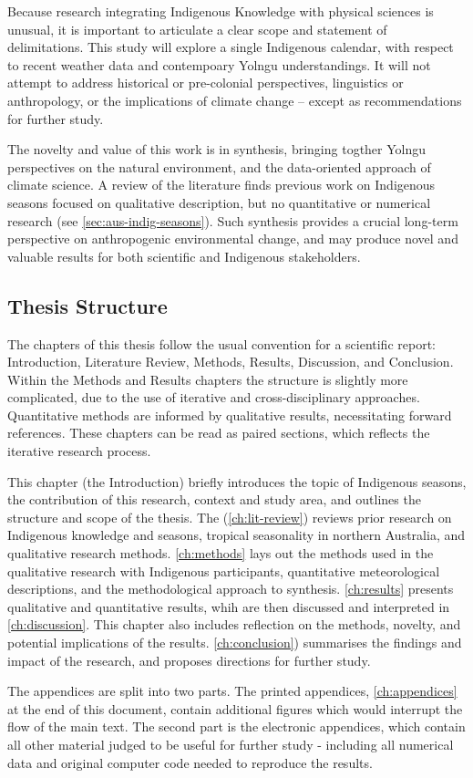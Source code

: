 Because research integrating Indigenous Knowledge with physical sciences is
unusual, it is important to articulate a clear scope and statement of delimitations.
This study will explore a single Indigenous calendar, with respect to recent weather data
and contempoary Yolngu understandings.  It will not attempt to address historical
or pre-colonial perspectives, linguistics or anthropology, or the implications
of climate change -- except as recommendations for further study.

The novelty and value of this work is in synthesis, bringing
togther Yolngu perspectives on the natural environment, and the
data-oriented approach of climate science.  A review of the literature
finds previous work on Indigenous seasons focused on qualitative description, but
no quantitative or numerical research (see \cref{sec:aus-indig-seasons}).
Such synthesis provides a crucial long-term perspective on
anthropogenic environmental change, and may produce novel and valuable
results for both scientific and Indigenous stakeholders.



\subsection*{Thesis Structure}

The chapters of this thesis follow the usual convention for a scientific
report: Introduction, Literature Review, Methods, Results, Discussion,
and Conclusion.  Within the Methods and Results chapters
the structure is slightly more complicated, due to the use of iterative and
cross-disciplinary approaches.  Quantitative methods are informed by
qualitative results, necessitating forward references.  These chapters
can be read as paired sections, which reflects the iterative research process.

This chapter (the Introduction) briefly introduces the topic of
Indigenous seasons, the contribution of this research, context and
study area, and outlines the structure and scope of the thesis.
The  (\cref{ch:lit-review}) reviews prior research
on Indigenous knowledge and seasons, tropical seasonality in northern
Australia, and qualitative research methods.
%
\cref{ch:methods} lays out the methods used in the qualitative research
with Indigenous participants, quantitative meteorological descriptions,
and the methodological approach to synthesis.  \cref{ch:results} presents
qualitative and quantitative results, whih are then discussed and interpreted
in \cref{ch:discussion}.  This chapter also includes reflection on the
methods, novelty, and potential implications of the results.
\cref{ch:conclusion}) summarises the findings and impact of the research,
and proposes directions for further study.

The appendices are split into two parts.  The printed appendices,
\cref{ch:appendices} at the end of this document, contain additional figures
which would interrupt the flow of the main text.  The second part
is the electronic appendices, which contain all other material judged to
be useful for further study - including all numerical data and original computer code
needed to reproduce the results.

